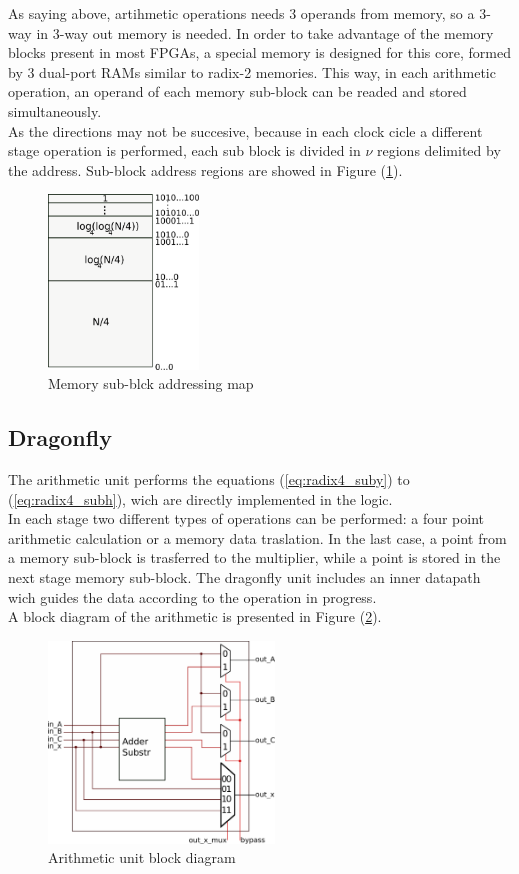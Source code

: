 \documentclass[conference]{IEEEtran}
\begin{document}
As saying above, artihmetic operations needs 3 operands from memory, so a 3-way in 3-way out memory is needed. 
In order to take advantage of the memory blocks present 
in most FPGAs, a special memory is designed for this core, formed by 3 dual-port RAMs similar to radix-2 memories. This way, 
in each arithmetic operation, an operand of each memory sub-block can be readed and stored simultaneously.\\
As the directions may not be succesive, because in each clock cicle a different stage operation is performed, each sub block 
is divided in $\nu$ regions delimited by the address. Sub-block address regions are showed in Figure (\ref{fig:tripleRamdir}).

\begin{figure}[htb!]
        \centering
        \includegraphics[width=4cm]{./figures/tripleRAMdir.png}
        \caption{Memory sub-blck addressing map}
        \label{fig:tripleRamdir}
\end{figure} 
 
 \subsection{Dragonfly}
 
 The arithmetic unit performs the equations (\ref{eq:radix4_suby}) to (\ref{eq:radix4_subh}), wich are directly implemented in 
 the logic.\\
 In each stage two different types of operations can be performed: a four point arithmetic calculation or a memory data traslation.
 In the last case, a point from a memory sub-block is trasferred to the multiplier, while a point is stored in the next stage memory sub-block.
 The dragonfly unit includes an inner datapath wich guides the data according to the operation in progress.\\
 A block diagram of the arithmetic is presented in Figure (\ref{fig:firefly}). 
 
 \begin{figure}[htb!]
        \centering
        \includegraphics[width=6cm]{./figures/firefly.png}
        \caption{Arithmetic unit block diagram}
        \label{fig:firefly}
\end{figure}
 
\end{document}
